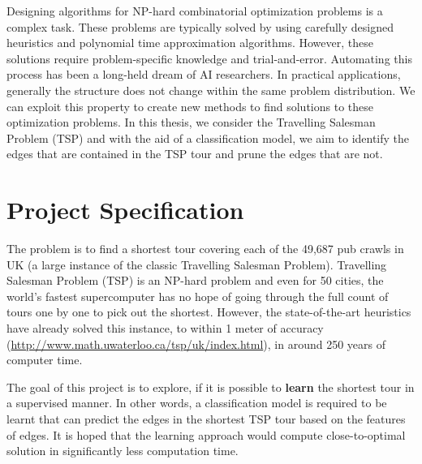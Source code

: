 \documentclass[]{UCD_CS_FYP_Report}
\begin{document}
\maketitle


\tableofcontents


\abstract
Designing algorithms for NP-hard combinatorial optimization problems is a complex task. These problems are typically solved by using carefully designed heuristics and polynomial time approximation algorithms. However, these solutions require problem-specific knowledge and trial-and-error. Automating this process has been a long-held dream of AI researchers. In practical applications, generally the structure does not change within the same problem distribution. We can exploit this property to create new methods to find solutions to these optimization problems. In this thesis, we consider the Travelling Salesman Problem (TSP) and with the aid of a classification model, we aim to identify the edges that are contained in the TSP tour and prune the edges that are not. 


\chapter{Project Specification}
The problem is to find a shortest tour covering each of the 49,687 pub crawls in UK (a large instance of the classic Travelling Salesman Problem). Travelling Salesman Problem (TSP) is an NP-hard problem and even for 50 cities, the world's fastest supercomputer has no hope of going through the full count of tours one by one to pick out the shortest. However, the state-of-the-art heuristics have already solved this instance, to within 1 meter of accuracy (\url{http://www.math.uwaterloo.ca/tsp/uk/index.html}), in around 250 years of computer time.

The goal of this project is to explore, if it is possible to \textbf{learn} the shortest tour in a supervised manner. In other words, a classification model is required to be learnt that can predict the edges in the shortest TSP tour based on the features of edges. It is hoped that the learning approach would compute close-to-optimal solution in significantly less computation time.\\[0.5cm]
\end{document}
